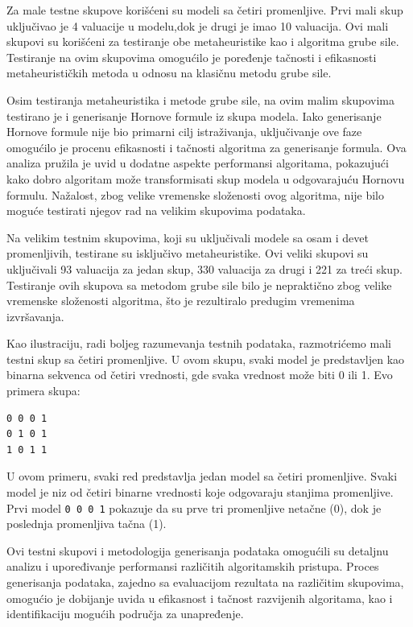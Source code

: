 \documentclass[12pt,oneside]{memoir}
\begin{document}
Za male testne skupove korišćeni su modeli sa četiri promenljive. Prvi mali skup uključivao je 4 valuacije u modelu,dok je drugi je imao 10 valuacija. Ovi mali skupovi su korišćeni za testiranje obe metaheuristike kao i algoritma grube sile. Testiranje na ovim skupovima omogućilo je poređenje tačnosti i efikasnosti metaheurističkih metoda u odnosu na klasičnu metodu grube sile. 

Osim testiranja metaheuristika i metode grube sile, na ovim malim skupovima testirano je i generisanje Hornove formule iz skupa modela. Iako generisanje Hornove formule nije bio primarni cilj istraživanja, uključivanje ove faze omogućilo je procenu efikasnosti i tačnosti algoritma za generisanje formula. Ova analiza pružila je uvid u dodatne aspekte performansi algoritama, pokazujući kako dobro algoritam može transformisati skup modela u odgovarajuću Hornovu formulu. Nažalost, zbog velike vremenske složenosti ovog algoritma, nije bilo moguće testirati njegov rad na velikim skupovima podataka.


Na velikim testnim skupovima, koji su uključivali modele sa osam i devet promenljivih, testirane su isključivo metaheuristike. Ovi veliki skupovi su uključivali 93 valuacija za jedan skup, 330 valuacija za drugi i 221 za treći skup. Testiranje ovih skupova sa metodom grube sile bilo je nepraktično zbog velike vremenske složenosti algoritma, što je rezultiralo predugim vremenima izvršavanja. 

Kao ilustraciju, radi boljeg razumevanja testnih podataka, razmotrićemo mali testni skup sa četiri promenljive. U ovom skupu, svaki model je predstavljen kao binarna sekvenca od četiri vrednosti, gde svaka vrednost može biti 0 ili 1. Evo primera skupa:

\begin{verbatim}
0 0 0 1
0 1 0 1
1 0 1 1
\end{verbatim}

U ovom primeru, svaki red predstavlja jedan model sa četiri promenljive. Svaki model je niz od četiri binarne vrednosti koje odgovaraju stanjima promenljive. Prvi model \texttt{0 0 0 1} pokazuje da su prve tri promenljive netačne (0), dok je poslednja promenljiva tačna (1).


Ovi testni skupovi i metodologija generisanja podataka omogućili su detaljnu analizu i upoređivanje performansi različitih algoritamskih pristupa. Proces generisanja podataka, zajedno sa evaluacijom rezultata na različitim skupovima, omogućio je dobijanje uvida u efikasnost i tačnost razvijenih algoritama, kao i identifikaciju mogućih područja za unapređenje.
\end{document}
